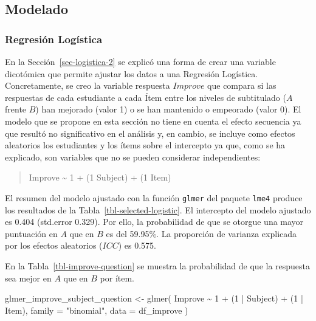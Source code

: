 \documentclass[
  12pt,
  a4paper,
  extrafontsizes,
  onecolumn,
  openright,
  table]{memoir}
\newenvironment{Shaded}{\begin{snugshade}}{\end{snugshade}}
\newcommand{\AttributeTok}[1]{\textcolor[rgb]{0.40,0.45,0.13}{#1}}
\newcommand{\DecValTok}[1]{\textcolor[rgb]{0.68,0.00,0.00}{#1}}
\newcommand{\FunctionTok}[1]{\textcolor[rgb]{0.28,0.35,0.67}{#1}}
\newcommand{\NormalTok}[1]{\textcolor[rgb]{0.00,0.23,0.31}{#1}}
\newcommand{\OtherTok}[1]{\textcolor[rgb]{0.00,0.23,0.31}{#1}}
\newcommand{\SpecialCharTok}[1]{\textcolor[rgb]{0.37,0.37,0.37}{#1}}
\newcommand{\StringTok}[1]{\textcolor[rgb]{0.13,0.47,0.30}{#1}}
\begin{document}
\hypertarget{modelado}{%
\subsection{Modelado}\label{modelado}}

\hypertarget{sec-logistica-3}{%
\subsubsection{Regresión Logística}\label{sec-logistica-3}}

En la Sección~\ref{sec-logistica-2} se explicó una forma de crear una
variable dicotómica que permite ajustar los datos a una Regresión
Logística. Concretamente, se creo la variable respuesta \(Improve\) que
compara si las respuestas de cada estudiante a cada Ítem entre los
niveles de subtitulado (\(A\) frente \(B\)) han mejorado (valor 1) o se
han mantenido o empeorado (valor 0). El modelo que se propone en esta
sección no tiene en cuenta el efecto secuencia ya que resultó no
significativo en el análisis y, en cambio, se incluye como efectos
aleatorios los estudiantes y los ítems sobre el intercepto ya que, como
se ha explicado, son variables que no se pueden considerar
independientes:

\begin{quote}
Improve \textasciitilde{} 1 + (1 \textbar{} Subject) + (1 \textbar{}
Item)
\end{quote}

El resumen del modelo ajustado con la función \texttt{glmer} del paquete
\texttt{lme4} \autocite[ver][]{lme4} produce los resultados de la
Tabla~\ref{tbl-selected-logistic}. El intercepto del modelo ajustado es
0.404 (std.error 0.329). Por ello, la probabilidad de que se otorgue una
mayor puntuación en \(A\) que en \(B\) es del 59.95\%. La proporción de
varianza explicada por los efectos aleatorios (\(ICC\)) es 0.575.

En la Tabla~\ref{tbl-improve-question} se muestra la probabilidad de que
la respuesta sea mejor en \(A\) que en \(B\) por ítem.

\scriptsize

\begin{Shaded}
\begin{Highlighting}[]
\NormalTok{glmer\_improve\_subject\_question }\OtherTok{\textless{}{-}} \FunctionTok{glmer}\NormalTok{(}
\NormalTok{    Improve }\SpecialCharTok{\textasciitilde{}} \DecValTok{1} \SpecialCharTok{+}\NormalTok{ (}\DecValTok{1} \SpecialCharTok{|}\NormalTok{ Subject) }\SpecialCharTok{+}\NormalTok{ (}\DecValTok{1} \SpecialCharTok{|}\NormalTok{ Item),}
    \AttributeTok{family =} \StringTok{"binomial"}\NormalTok{, }\AttributeTok{data =}\NormalTok{ df\_improve}
\NormalTok{)}
\end{Highlighting}
\end{Shaded}
\end{document}
